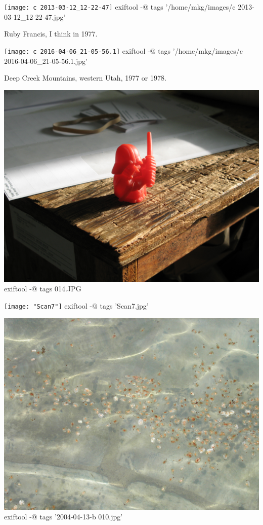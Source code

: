 \documentclass[11pt,chapterprefix=true,pagesize=letter]{scrbook}
\begin{document}
\newpage
\begin{center}
	\texttt{[image: c 2013-03-12\_12-22-47]}
	\bash[stdout]
	exiftool -@ tags '/home/mkg/images/c 2013-03-12_12-22-47.jpg'
	\END
\end{center}

\noindent Ruby Francis, I think in 1977.

\newpage
\begin{center}
	\texttt{[image: c 2016-04-06\_21-05-56.1]}
	\bash[stdout]
	exiftool -@ tags '/home/mkg/images/c 2016-04-06_21-05-56.1.jpg'
	\END
\end{center}

\noindent Deep Creek Mountains, western Utah, 1977 or 1978.

\newpage
\begin{center}
\includegraphics[width=\textwidth]{014.JPG}
\bash[stdout]
exiftool -@ tags 014.JPG
\END
\end{center}

\newpage
\begin{center}
	\texttt{[image: "Scan7"]}
	\bash[stdout]
	exiftool -@ tags 'Scan7.jpg'
	\END
\end{center}

\newpage
\begin{center}
\includegraphics[width=\textwidth]{"2004-04-13-b 010"}
\bash[stdout]
exiftool -@ tags '2004-04-13-b 010.jpg'
\END
\end{center}
\end{document}
